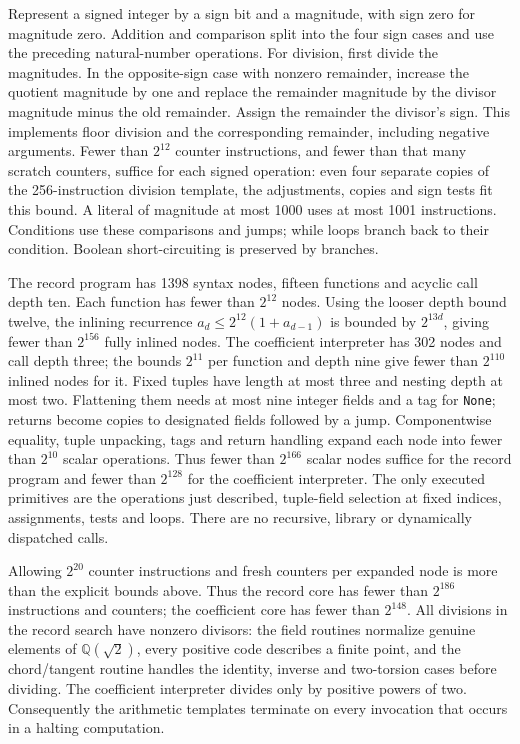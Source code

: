 Represent a signed integer by a sign bit and a magnitude, with sign
zero for magnitude zero. Addition and comparison split into the
four sign cases and use the preceding natural-number operations.
For division, first divide the magnitudes. In the opposite-sign
case with nonzero remainder, increase the quotient magnitude by
one and replace the remainder magnitude by the divisor magnitude
minus the old remainder. Assign the remainder the divisor's sign.
This implements floor division and the corresponding remainder,
including negative arguments. Fewer than $2^{12}$ counter
instructions, and fewer than that many scratch counters, suffice
for each signed operation: even four separate copies of the
256-instruction division template, the adjustments, copies and
sign tests fit this bound. A literal of magnitude at most 1000
uses at most 1001 instructions. Conditions use these comparisons
and jumps; while loops branch back to their condition. Boolean
short-circuiting is preserved by branches.

The record program has 1398 syntax nodes, fifteen functions and
acyclic call depth ten. Each function has fewer than $2^{12}$ nodes.
Using the looser depth bound twelve, the inlining recurrence
$a_d\le2^{12}(1+a_{d-1})$ is bounded by $2^{13d}$, giving fewer than
$2^{156}$ fully inlined nodes. The coefficient interpreter has 302
nodes and call depth three; the bounds $2^{11}$ per function and depth
nine give fewer than $2^{110}$ inlined nodes for it. Fixed tuples have
length at most three and nesting depth at most two. Flattening them needs at most nine
integer fields and a tag for \texttt{None}; returns become copies
to designated fields followed by a jump. Componentwise equality,
tuple unpacking, tags and return handling expand each node into
fewer than $2^{10}$ scalar operations. Thus fewer than $2^{166}$
scalar nodes suffice for the record program and fewer than $2^{128}$
for the coefficient interpreter. The only executed primitives are
the operations just described, tuple-field selection at fixed
indices, assignments, tests and loops. There are no recursive,
library or dynamically dispatched calls.

Allowing $2^{20}$ counter instructions and fresh counters per
expanded node is more than the explicit bounds above. Thus the
record core has fewer than $2^{186}$ instructions and counters;
the coefficient core has fewer than $2^{148}$. All divisions in the
record search have nonzero divisors: the field routines normalize
genuine elements of $\mathbb Q(\sqrt2)$, every positive code describes
a finite point, and the chord/tangent routine handles the identity,
inverse and two-torsion cases before dividing. The coefficient interpreter divides only by positive
powers of two. Consequently the arithmetic templates terminate
on every invocation that occurs in a halting computation.

